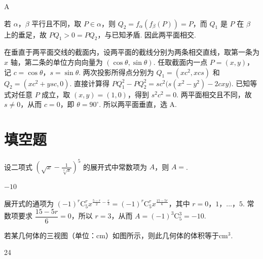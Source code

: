 \begin{answer}
A
\end{answer}

\begin{solution}
若 \(\alpha\)，\(\beta\) 平行且不同，取 \(P\in\alpha\)，则 \(Q_{2}=f_{\alpha}(f_{\beta}(P))=P\)，而 \(Q_{1}\) 是 \(P\) 在 \(\beta\) 上的垂足，故 \(PQ_{1}>0=PQ_{2}\)，与已知矛盾. 因此两平面相交.

在垂直于两平面交线的截面内，设两平面的截线分别为两条相交直线，取第一条为 \(x\) 轴，第二条的单位方向向量为 \((\cos\theta,\sin\theta)\). 任取截面内一点 \(P=(x,y)\)，记 \(c=\cos\theta\)，\(s=\sin\theta\). 两次投影所得点分别为 \(Q_{1}=(xc^{2},xcs)\) 和 \(Q_{2}=(xc^{2}+ysc,0)\). 直接计算得
\(PQ_{1}^{2}-PQ_{2}^{2}=sc^{2}\bigl(s(x^{2}-y^{2})-2cxy\bigr)\). 已知等式对任意 \(P\) 成立，取 \((x,y)=(1,0)\)，得到 \(s^{2}c^{2}=0\). 两平面相交且不同，故 \(s\ne0\)，从而 \(c=0\)，即 \(\theta=90^{\circ}\). 所以两平面垂直，选 A.
\end{solution}

\section{填空题}

\begin{problem}
设二项式 \(\left(\sqrt{x} - \frac{1}{\sqrt[3]{x}}\right)^5\) 的展开式中常数项为 \(A\)，则 \(A =\)\fillinblank{}.
\end{problem}

\begin{answer}
\(-10\)
\end{answer}

\begin{solution}
展开式的通项为 \((-1)^{r}\mathrm C_{5}^{r}x^{\frac{5-r}{2}-\frac{r}{3}}=(-1)^{r}\mathrm C_{5}^{r}x^{\frac{15-5r}{6}}\)，其中 \(r=0\)，\(1\)，\(\ldots\)，\(5\). 常数项要求 \(\dfrac{15-5r}{6}=0\)，所以 \(r=3\)，从而 \(A=(-1)^{3}\mathrm C_{5}^{3}=-10\).
\end{solution}

\begin{problem}
若某几何体的三视图（单位：\(\mathrm{cm}\)）如图所示，则此几何体的体积等于\fillinblank{}\(\mathrm{cm}^{3}\).

\end{problem}

\begin{answer}
24
\end{answer}

